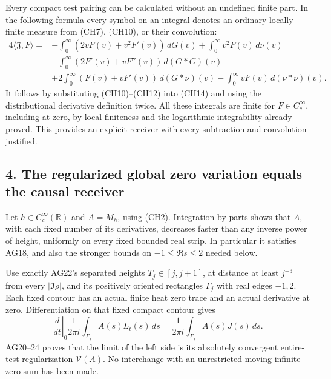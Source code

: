 \documentclass[
  10pt,
  a4paper,
]{article}
\begin{document}
Every compact test pairing can be calculated without an undefined finite
part. In the following formula every symbol on an integral denotes an
ordinary locally finite measure from (CH7), (CH10), or their
convolution: \[
\begin{aligned}
4\langle\mathfrak J,F\rangle={}&
-\int_0^\infty(2vF(v)+v^2F'(v))\,dG(v)
+\int_0^\infty v^2F(v)\,d\nu(v)\\
&-\int_0^\infty(2F'(v)+vF''(v))\,d(G*G)(v)\\
&+2\int_0^\infty(F(v)+vF'(v))\,d(G*\nu)(v)
-\int_0^\infty vF(v)\,d(\nu*\nu)(v).
\end{aligned}
\tag{CH16}
\] It follows by substituting (CH10)--(CH12) into (CH14) and using the
distributional derivative definition twice. All these integrals are
finite for \(F\in C_c^\infty\), including at zero, by local finiteness
and the logarithmic integrability already proved. This provides an
explicit receiver with every subtraction and convolution justified.

\subsection{4. The regularized global zero variation equals the causal
receiver}\label{the-regularized-global-zero-variation-equals-the-causal-receiver}

Let \(h\in C_c^\infty(\mathbb R)\) and \(A=M_h\), using (CH2).
Integration by parts shows that \(A\), with each fixed number of its
derivatives, decreases faster than any inverse power of height,
uniformly on every fixed bounded real strip. In particular it satisfies
AG18, and also the stronger bounds on \(-1\le\Re s\le2\) needed below.

Use exactly AG22's separated heights \(T_j\in[j,j+1]\), at distance at
least \(j^{-3}\) from every \(|\Im\rho|\), and its positively oriented
rectangles \(\Gamma_j\) with real edges \(-1,2\). Each fixed contour has
an actual finite heat zero trace and an actual derivative at zero.
Differentiation on that fixed compact contour gives \[
\left.\frac d{dt}\right|_0\frac1{2\pi i}\int_{\Gamma_j}A(s)L_t(s)\,ds
=\frac1{2\pi i}\int_{\Gamma_j}A(s)J(s)\,ds.
\tag{CH17}
\] AG20--24 proves that the limit of the left side is its absolutely
convergent entire-test regularization \(\mathcal V(A)\). No interchange
with an unrestricted moving infinite zero sum has been made.
\end{document}
